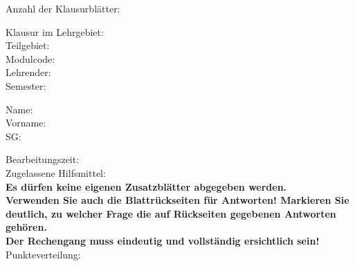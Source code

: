 \thispagestyle{firstpage}

\begin{flushright}
Anzahl der Klausurblätter: \pageref*{LastTask}
\end{flushright}

Klausur im Lehrgebiet: \module \\

Teilgebiet: \submodule \\

Modulcode: \modulecode \\

Lehrender: \lecturer \\

Semester: \termnumber \\

\begin{vwcol}[widths={0.4,0.4,0.2},sep=0cm, justify=flush,rule=0pt,indent=4em]
Name:\\
Vorname:\\
SG:
\end{vwcol}

\bigskip
\bigskip
\bigskip
Bearbeitungszeit: \allottedtime \\

Zugelassene Hilfsmittel: \permittedtools \\

\textbf{Es dürfen keine eigenen Zusatzblätter abgegeben werden.} \\

\textbf{Verwenden Sie auch die Blattrückseiten für Antworten! Markieren Sie deutlich, zu welcher Frage die auf Rückseiten gegebenen Antworten gehören.} \\

\textbf {Der Rechengang muss eindeutig und vollständig ersichtlich sein!} \\

Punkteverteilung:

\bigskip

\scoretable
